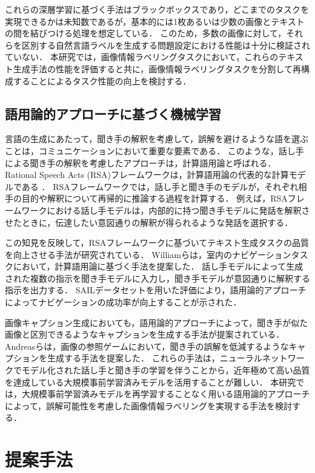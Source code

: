 \documentclass[a4paper,11pt]{jreport}
\begin{document}
これらの深層学習に基づく手法はブラックボックスであり，どこまでのタスクを実現できるかは未知数であるが，基本的には1枚あるいは少数の画像とテキストの間を結びつける処理を想定している．
このため，多数の画像に対して，それらを区別する自然言語ラベルを生成する問題設定における性能は十分に検証されていない．
本研究では，画像情報ラベリングタスクにおいて，これらのテキスト生成手法の性能を評価すると共に，画像情報ラベリングタスクを分割して再構成することによるタスク性能の向上を検討する．

\section{語用論的アプローチに基づく機械学習}
\label{sec:relwork_pragmatic_ml}
言語の生成にあたって，聞き手の解釈を考慮して，誤解を避けるような語を選ぶことは，コミュニケーションにおいて重要な要素である．
このような，話し手による聞き手の解釈を考慮したアプローチは，計算語用論と呼ばれる\cite{Fried2023}．
Rational Speech Acts (RSA)フレームワークは，計算語用論の代表的な計算モデルである \cite{Frank2012,Goodman2016}．
RSAフレームワークでは，話し手と聞き手のモデルが，それぞれ相手の目的や解釈について再帰的に推論する過程を計算する．
例えば，RSAフレームワークにおける話し手モデルは，内部的に持つ聞き手モデルに発話を解釈させたときに，伝達したい意図通りの解釈が得られるような発話を選択する．

この知見を反映して，RSAフレームワークに基づいてテキスト生成タスクの品質を向上させる手法が研究されている\cite{Fried2017}．
Williamら\cite{Williams2015}は，室内のナビゲーションタスクにおいて，計算語用論に基づく手法を提案した．
話し手モデルによって生成された複数の指示を聞き手モデルに入力し，聞き手モデルが意図通りに解釈する指示を出力する．
SAILデータセットを用いた評価により，語用論的アプローチによってナビゲーションの成功率が向上することが示された．

画像キャプション生成においても，語用論的アプローチによって，聞き手が似た画像と区別できるようなキャプションを生成する手法が提案されている\cite{Vedantam2017,Cohn-Gordon2018,Nie2020}．
Andreasら\cite{Andreas2016}は，画像の参照ゲームにおいて，聞き手の誤解を低減するようなキャプションを生成する手法を提案した．
これらの手法は，ニューラルネットワークでモデル化された話し手と聞き手の学習を伴うことから，近年極めて高い品質を達成している大規模事前学習済みモデルを活用することが難しい．
本研究では，大規模事前学習済みモデルを再学習することなく用いる語用論的アプローチによって，誤解可能性を考慮した画像情報ラベリングを実現する手法を検討する．

\chapter{提案手法}
\end{document}
